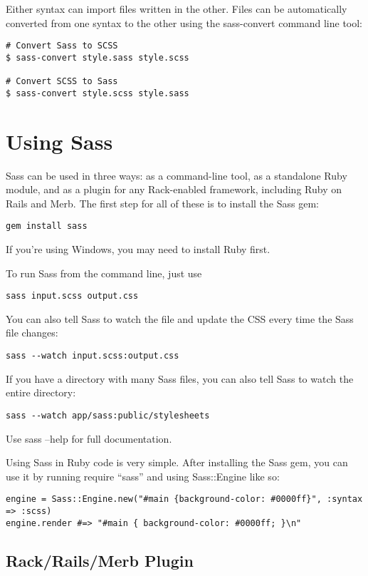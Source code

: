 \documentclass[9pt]{article}
\begin{document}
 Either syntax can import files written in the other. Files can be automatically converted from one syntax to the other using the sass-convert command line tool:
\begin{verbatim}
# Convert Sass to SCSS
$ sass-convert style.sass style.scss

# Convert SCSS to Sass
$ sass-convert style.scss style.sass
\end{verbatim}
\section{Using Sass}


 Sass can be used in three ways: as a command-line tool, as a standalone Ruby module, and as a plugin for any Rack-enabled framework, including Ruby on Rails and Merb. The first step for all of these is to install the Sass gem:
\begin{verbatim}
gem install sass
\end{verbatim}


 If you’re using Windows, you may need to install Ruby first.


 To run Sass from the command line, just use
\begin{verbatim}
sass input.scss output.css
\end{verbatim}


 You can also tell Sass to watch the file and update the CSS every time the Sass file changes:
\begin{verbatim}
sass --watch input.scss:output.css
\end{verbatim}


 If you have a directory with many Sass files, you can also tell Sass to watch the entire directory:
\begin{verbatim}
sass --watch app/sass:public/stylesheets
\end{verbatim}


 Use sass --help for full documentation.


 Using Sass in Ruby code is very simple. After installing the Sass gem, you can use it by running require ``sass'' and using Sass::Engine like so:
\begin{verbatim}
engine = Sass::Engine.new("#main {background-color: #0000ff}", :syntax => :scss)
engine.render #=> "#main { background-color: #0000ff; }\n"
\end{verbatim}
\subsection{Rack/Rails/Merb Plugin}
\end{document}
